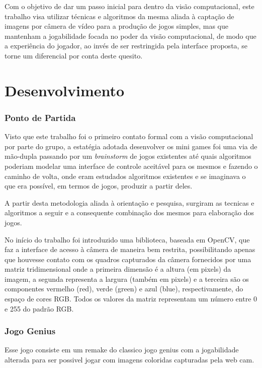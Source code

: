 \documentclass[a4paper]{article}
\begin{document}
Com o objetivo de dar um passo inicial para dentro da visão computacional, este trabalho visa utilizar técnicas e algoritmos da mesma aliada à captação de imagens por câmera de vídeo para a produção de jogos simples, mas que mantenham a jogabilidade focada no poder da visão computacional, de modo que a experiência do jogador, ao invés de ser restringida pela interface proposta, se torne um diferencial por conta deste quesito.



\section{Desenvolvimento}



\subsubsection{Ponto de Partida}


Visto que este trabalho foi o primeiro contato formal com a visão computacional por parte do grupo, a estatégia adotada desenvolver os mini games foi uma via de mão-dupla passando por um \textit{brainstorm} de jogos existentes até quais algoritmos poderiam modelar uma interface de controle aceitável para os mesmos e fazendo o caminho de volta, onde eram estudados algoritmos existentes e se imaginava o que era possível, em termos de jogos, produzir a partir deles.

A partir desta metodologia aliada à orientação e pesquisa, surgiram as tecnicas e algoritmos a seguir e a consequente combinação dos mesmos para elaboração dos jogos. 

No início do trabalho foi introduzido uma biblioteca, baseada em OpenCV, que faz a interface de acesso à câmera de maneira bem restrita, possibilitando apenas que houvesse contato com os quadros capturados da câmera fornecidos por uma matriz tridimensional onde a primeira dimensão é a altura (em pixels) da imagem, a segunda representa a largura (também em pixels) e a terceira são os componentes vermelho (red), verde (green) e azul (blue), respectivamente, do espaço de cores RGB. Todos os valores da matriz representam um número entre 0 e 255 do padrão RGB.


\subsubsection{ Jogo Genius}


Esse jogo consiste em um remake do classico jogo genius com a jogabilidade alterada para ser possivel jogar com imagens coloridas capturadas pela web cam.
\end{document}
